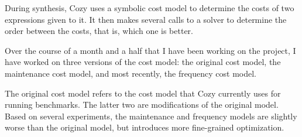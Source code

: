 During synthesis, Cozy uses a symbolic cost model to determine the costs of two
expressions given to it. It then makes several calls to a solver to determine
the order between the costs, that is, which one is better.

Over the course of a month and a half that I have been working on the project, 
I have worked on three versions of the cost model: the original cost model, the
maintenance cost model, and most recently, the frequency cost model.

The original cost model refers to the cost model that Cozy currently uses for
running benchmarks. The latter two are modifications of the original model.
Based on several experiments, the maintenance and frequency models are slightly
worse than the original model, but introduces more fine-grained optimization. 
